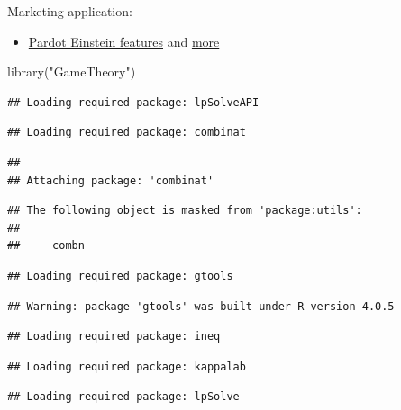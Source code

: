 \documentclass[
]{book}
\newenvironment{Shaded}{\begin{snugshade}}{\end{snugshade}}
\newcommand{\FunctionTok}[1]{\textcolor[rgb]{0.00,0.00,0.00}{#1}}
\newcommand{\NormalTok}[1]{#1}
\newcommand{\StringTok}[1]{\textcolor[rgb]{0.31,0.60,0.02}{#1}}
\providecommand{\tightlist}{%
  \setlength{\itemsep}{0pt}\setlength{\parskip}{0pt}}
\begin{document}
Marketing application:

\begin{itemize}
\tightlist
\item
  \href{\%5Bhttps://salesforceben.com/the-drip/complete-overview-of-pardot-einstein-features\%5D(https://salesforceben.com/the-drip/complete-overview-of-pardot-einstein-features/)}{Pardot Einstein features} and \href{https://www.salesforceben.com/the-drip/pardot-einstein-attribution-a-deeper-dive/}{more}
\end{itemize}

\begin{Shaded}
\begin{Highlighting}[]
\FunctionTok{library}\NormalTok{(}\StringTok{"GameTheory"}\NormalTok{)}
\end{Highlighting}
\end{Shaded}

\begin{verbatim}
## Loading required package: lpSolveAPI
\end{verbatim}

\begin{verbatim}
## Loading required package: combinat
\end{verbatim}

\begin{verbatim}
## 
## Attaching package: 'combinat'
\end{verbatim}

\begin{verbatim}
## The following object is masked from 'package:utils':
## 
##     combn
\end{verbatim}

\begin{verbatim}
## Loading required package: gtools
\end{verbatim}

\begin{verbatim}
## Warning: package 'gtools' was built under R version 4.0.5
\end{verbatim}

\begin{verbatim}
## Loading required package: ineq
\end{verbatim}

\begin{verbatim}
## Loading required package: kappalab
\end{verbatim}

\begin{verbatim}
## Loading required package: lpSolve
\end{verbatim}
\end{document}
